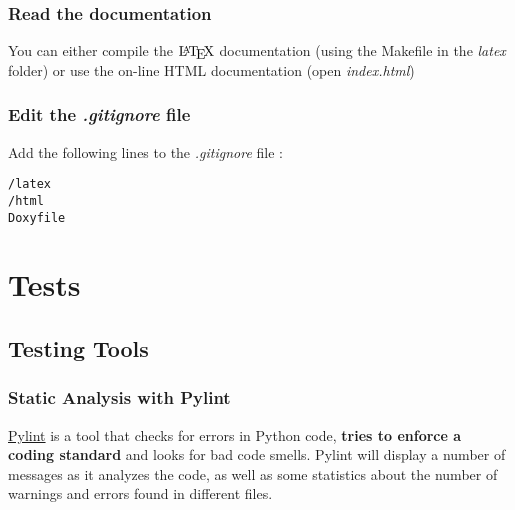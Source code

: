 \documentclass[a4paper]{report}
\begin{document}
\subsection{Read the documentation\\}
You can either compile the $\mbox{\LaTeX}$ documentation (using the Makefile in the \emph{latex} folder) or use the on-line HTML documentation (open \emph{index.html})

\subsection{Edit the \emph{.gitignore} file}
Add the following lines to the \emph{.gitignore} file : 
\begin{verbatim}
/latex
/html
Doxyfile
\end{verbatim}



\chapter{Tests}
\section{Testing Tools}
\subsection{Static Analysis with Pylint}
\href{https://www.pylint.org}{Pylint} is a tool that checks for errors in Python code, \textbf{tries to enforce a coding standard} and looks for bad code smells. Pylint will display a number of messages as it analyzes the code, as well as some statistics about the number of warnings and errors found in different files. 

	

\end{document}
